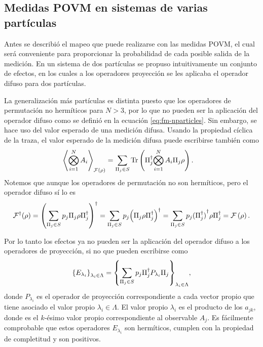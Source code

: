 \documentclass[12pt,oneside]{book}\raggedbottom{}
\begin{document}
\subsection*{Medidas POVM en sistemas de varias partículas}



Antes se describió el mapeo que puede realizarse con las medidas POVM, el cual será conveniente para proporcionar la probabilidad de cada posible salida de la medición. En un sistema de dos partículas se propuso intuitivamente un conjunto de efectos, en los cuales a los operadores proyección se les aplicaba el operador difuso para dos partículas.


La generalización más partículas es distinta puesto que los operadores de permutación no hermíticos para $N>3$, por lo que no pueden ser la aplicación del operador difuso como se definió en la ecuación {\eqref{eq:fm-nparticles}}. Sin embargo, se hace uso del valor esperado de una medición difusa. Usando la propiedad cíclica de la traza, el valor esperado de la medición difusa puede escribirse también como \begin{equation}\label{eq:ExpectedValue-generalForm-2}\begin{split}
    \left \langle \bigotimes_{i=1}^{N} A_i\right \rangle_{\mathcal{F}(\rho)} &=\sum_{\Pi_j \in S}{\rm Tr} \left(\Pi_j^\dagger{\bigotimes_{i=1}^{N}A_i}\Pi_j\rho\right).
\end{split}
\end{equation} Notemos que aunque los operadores de permutación no son hermíticos, pero el operador difuso sí lo es \[\mathcal{F}^\dagger{(\rho)}={\left(\sum_{\Pi_j \in S} p_j \Pi_{j}\rho\Pi_{j}^{\dagger}\right)}^\dagger =\sum_{\Pi_j \in S} p_j{\left(\Pi_{j}\rho\Pi_{j}^{\dagger}\right)}^\dagger=\sum_{\Pi_j \in S} p_j {(\Pi_{j}^\dagger)}^\dagger \rho\Pi_{j}^\dagger= \mathcal{F}\left(\rho\right).\]

Por lo tanto los efectos ya no pueden ser la aplicación del operador difuso a los operadores de proyección, si no que pueden escribirse como \begin{equation}\label{eq:effectsSetNp}
    {\{E_{\lambda_i}\}}_{\lambda_i \in \Lambda}={\left\{\sum_{\Pi_j \in S} p_j \Pi_{j}^{\dagger}P_{\lambda_i}\Pi_{j}\right\}}_{\lambda_i \in \Lambda},
\end{equation}  
donde $P_{\lambda_i}$ es el operador de proyección correspondiente a cada vector propio que tiene asociado el valor propio $\lambda_i\in \Lambda$. %
El valor propio $\lambda_i$ es el producto de los $a_{jk}$, donde es el $k$-ésimo valor propio correspondiente al observable $A_j$. Es fácilmente comprobable que estos operadores $E_{\lambda_i}$ son hermíticos, cumplen con la propiedad de completitud y son positivos.
\end{document}
